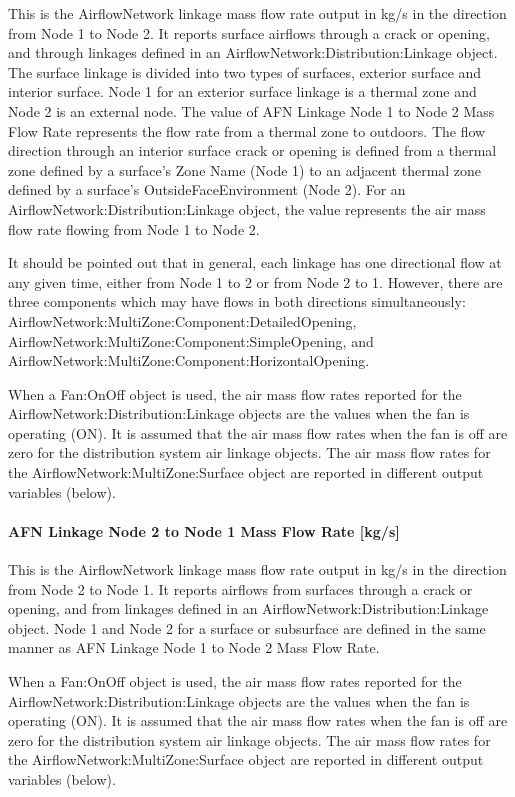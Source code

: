 This is the AirflowNetwork linkage mass flow rate output in kg/s in the direction from Node 1 to Node 2. It reports surface airflows through a crack or opening, and through linkages defined in an AirflowNetwork:Distribution:Linkage object. The surface linkage is divided into two types of surfaces, exterior surface and interior surface. Node 1 for an exterior surface linkage is a thermal zone and Node 2 is an external node. The value of AFN Linkage Node 1 to Node 2 Mass Flow Rate represents the flow rate from a thermal zone to outdoors. The flow direction through an interior surface crack or opening is defined from a thermal zone defined by a surface's Zone Name (Node 1) to an adjacent thermal zone defined by a surface's OutsideFaceEnvironment (Node 2). For an AirflowNetwork:Distribution:Linkage object, the value represents the air mass flow rate flowing from Node 1 to Node 2.

It should be pointed out that in general, each linkage has one directional flow at any given time, either from Node 1 to 2 or from Node 2 to 1. However, there are three components which may have flows in both directions simultaneously: AirflowNetwork:MultiZone:Component:DetailedOpening, AirflowNetwork:MultiZone:Component:SimpleOpening, and AirflowNetwork:MultiZone:Component:HorizontalOpening.

When a Fan:OnOff object is used, the air mass flow rates reported for the AirflowNetwork:Distribution:Linkage objects are the values when the fan is operating (ON). It is assumed that the air mass flow rates when the fan is off are zero for the distribution system air linkage objects. The air mass flow rates for the AirflowNetwork:MultiZone:Surface object are reported in different output variables (below).

\paragraph{AFN Linkage Node 2 to Node 1 Mass Flow Rate {[}kg/s{]}}\label{afn-linkage-node-2-to-node-1-mass-flow-rate-kgs}

This is the AirflowNetwork linkage mass flow rate output in kg/s in the direction from Node 2 to Node 1. It reports airflows from surfaces through a crack or opening, and from linkages defined in an AirflowNetwork:Distribution:Linkage object. Node 1 and Node 2 for a surface or subsurface are defined in the same manner as AFN Linkage Node 1 to Node 2 Mass Flow Rate.

When a Fan:OnOff object is used, the air mass flow rates reported for the AirflowNetwork:Distribution:Linkage objects are the values when the fan is operating (ON). It is assumed that the air mass flow rates when the fan is off are zero for the distribution system air linkage objects. The air mass flow rates for the AirflowNetwork:MultiZone:Surface object are reported in different output variables (below).

